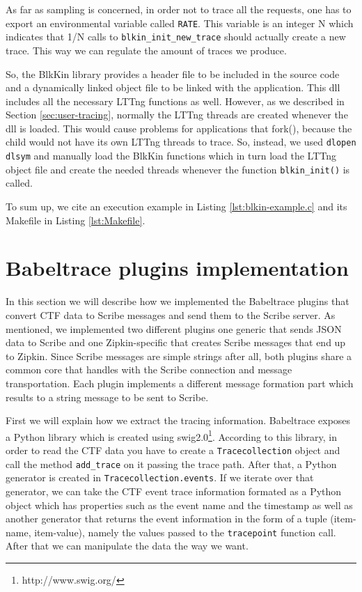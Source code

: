 As far as sampling is concerned, in order not to trace all the requests, one has
to export an environmental variable called \texttt{RATE}. This variable is an
integer N which indicates that 1/N calls to \texttt{blkin\_init\_new\_trace}
should actually create a new trace. This way we can regulate the amount of
traces we produce.

So, the BlkKin library provides a header file to be included in the source code
and a dynamically linked object file to be linked with the application. This dll
includes all the necessary LTTng functions as well. However, as we described in
Section \ref{sec:user-tracing}, normally the LTTng threads are created whenever
the dll is loaded. This would cause problems for applications that fork(),
because the child would not have its own LTTng threads to trace. So, instead, we
used \texttt{dlopen} \texttt{dlsym} and manually load the BlkKin functions which
in turn load the LTTng object file and create the needed threads whenever the
function \texttt{blkin\_init()} is called.

To sum up, we cite an execution example in Listing \ref{lst:blkin-example.c} and
its Makefile in Listing \ref{lst:Makefile}.


\section{Babeltrace plugins implementation}

In this section we will describe how we implemented the Babeltrace plugins that
convert CTF data to Scribe messages and send them to the Scribe server. As
mentioned, we implemented two different plugins one generic that sends JSON data
to Scribe and one Zipkin-specific that creates Scribe messages that end up to
Zipkin. Since Scribe messages are simple strings after all, both plugins share a
common core that handles with the Scribe connection and message transportation.
Each plugin implements a different message formation part which results to a
string message to be sent to Scribe.

First we will explain how we extract the tracing information. Babeltrace exposes
a Python library which is created using swig2.0\footnote{http://www.swig.org/}.
According to this library, in order to read the CTF data you have to create a
\texttt{Tracecollection} object and call the method \texttt{add\_trace} on it
passing the trace path. After that, a Python generator is created in
\texttt{Tracecollection.events}. If we iterate over that generator, we can take
the CTF event trace information formated as a Python object which has properties
such as the event name and the timestamp as well as another generator that
returns the event information in the form of a tuple (item-name, item-value),
namely the values passed to the \texttt{tracepoint} function call. After that we
can manipulate the data the way we want.

